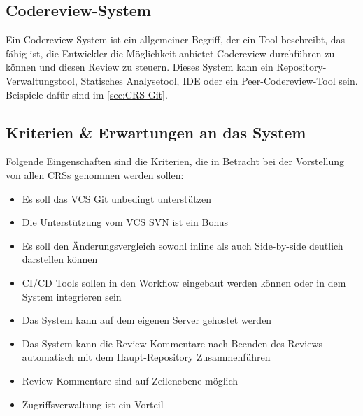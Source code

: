 \subsection{Codereview-System}
\label{subsec:CRS}

Ein Codereview-System ist ein allgemeiner Begriff, der ein Tool beschreibt, das fähig ist, die Entwickler die Möglichkeit anbietet Codereview durchführen zu können und diesen Review zu steuern. Dieses System kann ein Repository-Verwaltungstool, Statisches Analysetool, IDE oder ein Peer-Codereview-Tool sein. Beispiele dafür sind im \cref{sec:CRS-Git}.

\subsection{Kriterien \& Erwartungen an das System}
\label{sec:kriterien}

Folgende Eingenschaften sind die Kriterien, die in Betracht bei der Vorstellung von allen \acp{CRS} genommen werden sollen:

\begin{itemize}
	\item Es soll das \ac{VCS} Git unbedingt unterstützen
	\item Die Unterstützung vom \ac{VCS} \ac{SVN} ist ein Bonus
	\item Es soll den Änderungsvergleich sowohl inline als auch Side-by-side deutlich darstellen können
	\item \ac{CI}/\ac{CD} Tools sollen in den Workflow eingebaut werden können oder in dem System integrieren sein
	\item Das System kann auf dem eigenen Server gehostet werden
	\item Das System kann die Review-Kommentare nach Beenden des Reviews automatisch mit dem Haupt-Repository Zusammenführen
	\item Review-Kommentare sind auf Zeilenebene möglich
	\item Zugriffsverwaltung ist ein Vorteil
\end{itemize}
